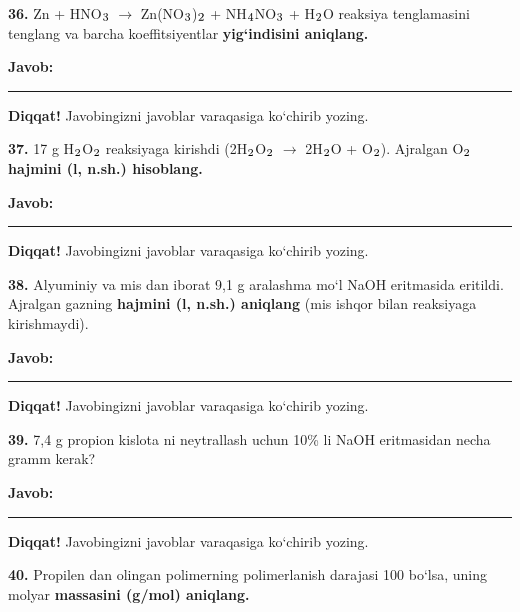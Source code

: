 \documentclass[11pt,a4paper]{article}
\renewcommand{\textsubscript}[1]{\ensuremath{_{\text{\fontsize{8}{8}\selectfont #1}}}}
\newcommand{\javob}{\par\smallskip\noindent\textbf{Javob:} \rule[-2pt]{7.5cm}{0.4pt}\par\smallskip\noindent\textbf{Diqqat!} Javobingizni javoblar varaqasiga ko`chirib yozing.\par\medskip}
\begin{document}
\noindent\setlength{\fboxsep}{0pt}
\par\bigskip
\noindent\textbf{36.} Zn + HNO\textsubscript{3} $\to$ Zn(NO\textsubscript{3})\textsubscript{2} + NH\textsubscript{4}NO\textsubscript{3} + H\textsubscript{2}O reaksiya tenglamasini tenglang va barcha koeffitsiyentlar \textbf{yig`indisini aniqlang.}
\javob
\noindent\textbf{37.} 17 g H\textsubscript{2}O\textsubscript{2} reaksiyaga kirishdi (2H\textsubscript{2}O\textsubscript{2} $\to$ 2H\textsubscript{2}O + O\textsubscript{2}). Ajralgan O\textsubscript{2} \textbf{hajmini (l, n.sh.) hisoblang.}
\javob
\noindent\textbf{38.} Alyuminiy va mis dan iborat 9,1 g aralashma mo`l NaOH eritmasida eritildi. Ajralgan gazning \textbf{hajmini (l, n.sh.) aniqlang} (mis ishqor bilan reaksiyaga kirishmaydi).
\javob
\noindent\textbf{39.} 7,4 g propion kislota ni neytrallash uchun 10\% li NaOH eritmasidan necha gramm kerak?
\javob
\noindent\textbf{40.} Propilen dan olingan polimerning polimerlanish darajasi 100 bo`lsa, uning molyar \textbf{massasini (g/mol) aniqlang.}
\end{document}
